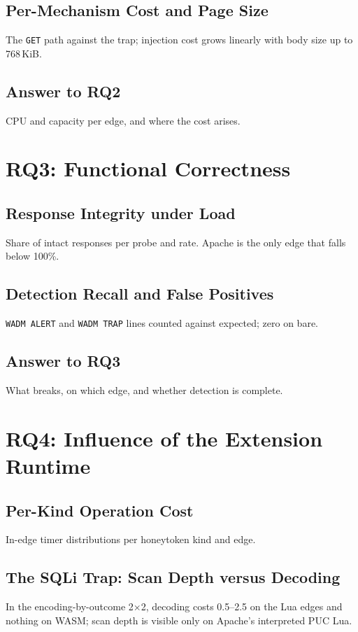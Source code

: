 \documentclass{rptuma}
\begin{document}
\subsection{Per-Mechanism Cost and Page Size}
The \texttt{GET} path against the trap; injection cost grows linearly with body size up to
768\,KiB.
\subsection{Answer to RQ2}
CPU and capacity per edge, and where the cost arises.

\section{RQ3: Functional Correctness}
\subsection{Response Integrity under Load}
Share of intact responses per probe and rate. Apache is the only edge that falls below 100\%.
\subsection{Detection Recall and False Positives}
\texttt{WADM ALERT} and \texttt{WADM TRAP} lines counted against expected; zero on bare.
\subsection{Answer to RQ3}
What breaks, on which edge, and whether detection is complete.

\section{RQ4: Influence of the Extension Runtime}
\subsection{Per-Kind Operation Cost}
In-edge timer distributions per honeytoken kind and edge.
\subsection{The SQLi Trap: Scan Depth versus Decoding}
In the encoding-by-outcome 2$\times$2, decoding costs 0.5--2.5\us{} on the Lua edges and nothing
on WASM; scan depth is visible only on Apache's interpreted PUC Lua.
\end{document}
